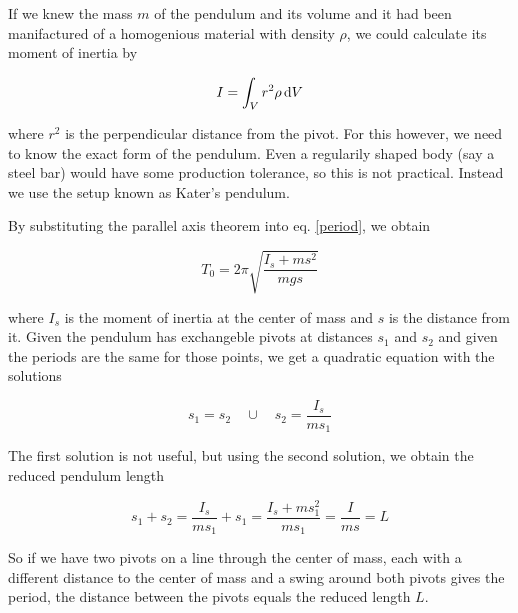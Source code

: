 \documentclass[a4paper,german,12pt,smallheadings]{scrartcl}
\begin{document}
If we knew the mass $m$ of the pendulum and its volume and it had been
manifactured of a homogenious material with density $\rho$, we could calculate
its moment of inertia by

\begin{equation}
  I = \int_V r^2 \rho \dif V
\end{equation}

where $r^2$ is the perpendicular distance from the pivot. For this however, we
need to know the exact form of the pendulum. Even a regularily shaped body (say
a steel bar) would have some production tolerance, so this is not practical.
Instead we use the setup known as Kater's pendulum.

By substituting the parallel axis theorem into eq. \ref{period}, we obtain

\begin{equation}
  T_{0} = 2 \pi \sqrt{\frac{I_s + ms^2}{mgs}}
\end{equation}

where $I_s$ is the moment of inertia at the center of mass and $s$ is the
distance from it. Given the pendulum has exchangeble pivots at distances $s_1$
and $s_2$ and given the periods are the same for those points, we get a
quadratic equation with the solutions

\begin{equation}
  s_1 = s_2 \quad \cup \quad s_2 = \frac{I_s}{m s_1}
\end{equation}

The first solution is not useful, but using the second solution, we obtain the
reduced pendulum length

\begin{equation}
  s_1 + s_2 = \frac{I_s}{ms_1} + s_1 = \frac{I_s + ms_1^2}{ms_1} = \frac{I}{ms} = L
\end{equation}

So if we have two pivots on a line through the center of mass, each with a
different distance to the center of mass and a swing around both pivots gives
the period, the distance between the pivots equals the reduced length $L$.
\end{document}
